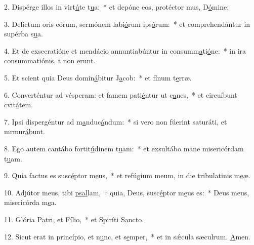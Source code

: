 2. Dispérge illos in virt\uline{ú}te t\uline{u}a:~* et depóne eos, protéctor mus, D\uline{ó}mine:\par 
3. Delíctum oris eórum, sermónem labi\uline{ó}rum ips\uline{ó}rum:~* et comprehendántur in supérba s\uline{u}a.\par 
4. Et de exsecratióne et mendácio annuntiabúntur in consumm\uline{a}ti\uline{ó}ne:~* in ira consummatiónis, t non \uline{e}runt.\par 
5. Et scient quia Deus domin\uline{á}bitur J\uline{a}cob:~* et fínum t\uline{e}rræ.\par 
6. Converténtur ad vésperam: et famem pati\uline{é}ntur ut c\uline{a}nes,~* et circuíbunt cvit\uline{á}tem.\par 
7. Ipsi dispergéntur ad m\uline{a}nduc\uline{á}ndum:~* si vero non fúerint saturáti, et mrmur\uline{á}bunt.\par 
8. Ego autem cantábo fortit\uline{ú}dinem t\uline{u}am:~* et exsultábo mane misericórdam t\uline{u}am.\par 
9. Quia factus es susc\uline{é}ptor m\uline{e}us,~* et refúgium meum, in die tribulatinis m\uline{e}æ.\par 
10. Adjútor meus, tibi \uline{psal}lam,~† quia, Deus, susc\uline{é}ptor m\uline{e}us es:~* Deus meus, misericórda m\uline{e}a.\par 
11. Glória P\uline{a}tri, et F\uline{í}lio,~* et Spiríti S\uline{a}ncto.\par 
12. Sicut erat in princípio, et n\uline{u}nc, et s\uline{e}mper,~* et in sǽcula sæculrum. \uline{A}men.\par 
